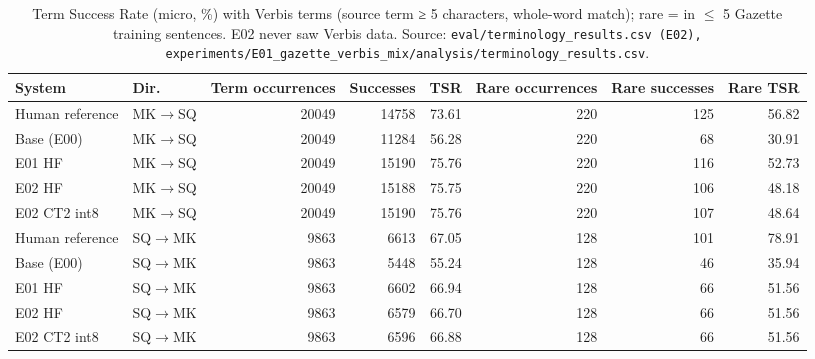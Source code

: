 \begin{table}[t]
\centering
\small
\begin{tabular}{llrrrrrr}
\toprule
System & Dir. & Term occurrences & Successes & TSR & Rare occurrences & Rare successes & Rare TSR \\
\midrule
Human reference & MK$\rightarrow$SQ & 20049 & 14758 & 73.61 & 220 & 125 & 56.82 \\
Base (E00) & MK$\rightarrow$SQ & 20049 & 11284 & 56.28 & 220 & 68 & 30.91 \\
E01 HF & MK$\rightarrow$SQ & 20049 & 15190 & 75.76 & 220 & 116 & 52.73 \\
E02 HF & MK$\rightarrow$SQ & 20049 & 15188 & 75.75 & 220 & 106 & 48.18 \\
E02 CT2 int8 & MK$\rightarrow$SQ & 20049 & 15190 & 75.76 & 220 & 107 & 48.64 \\
Human reference & SQ$\rightarrow$MK & 9863 & 6613 & 67.05 & 128 & 101 & 78.91 \\
Base (E00) & SQ$\rightarrow$MK & 9863 & 5448 & 55.24 & 128 & 46 & 35.94 \\
E01 HF & SQ$\rightarrow$MK & 9863 & 6602 & 66.94 & 128 & 66 & 51.56 \\
E02 HF & SQ$\rightarrow$MK & 9863 & 6579 & 66.70 & 128 & 66 & 51.56 \\
E02 CT2 int8 & SQ$\rightarrow$MK & 9863 & 6596 & 66.88 & 128 & 66 & 51.56 \\
\bottomrule
\end{tabular}
\caption{Term Success Rate (micro, \%) with Verbis terms (source term ≥ 5 characters, whole-word match); rare = in $\leq$ 5 Gazette training sentences. E02 never saw Verbis data. Source: \texttt{eval/terminology\_results.csv (E02), experiments/E01\_gazette\_verbis\_mix/analysis/terminology\_results.csv}.}
\label{tab:e02-terminology}
\end{table}
